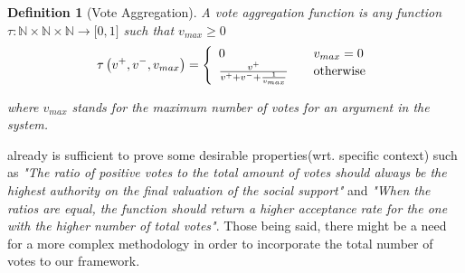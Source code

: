 \documentclass{article}
\newtheorem{definition}{Definition}
\begin{document}
\begin{definition}
[Vote Aggregation]A vote aggregation function is any function
$\tau:
\mathbb{N} \times \mathbb{N} \times \mathbb{N}
\rightarrow\lbrack0,1]$ such that $v_{max}\geq0$
\[
\tau\left(  v^{+},v^{-}, v_{max}\right)  =\left\{
\begin{array}
[c]{lll}
0 &  & v_{max}=0\\
\frac{v^{+}}{v^{+}+v^{-}+\frac{1}{v_{max}}} &  & \text{otherwise}
\end{array}
\right.
\]

where $v_{max}$ stands for the maximum number of votes for an argument in the system.
\end{definition}

already is sufficient to prove some desirable properties(wrt. specific context) such as \textit{"The ratio of positive votes to the total amount of votes should always be the highest authority on the final valuation of the social support"} and \textit{"When the ratios are equal, the function should return a higher acceptance rate for the one with the higher number of total votes"}. Those being said, there might be a need for a more complex methodology in order to incorporate the total number of votes to our framework.
\end{document}
